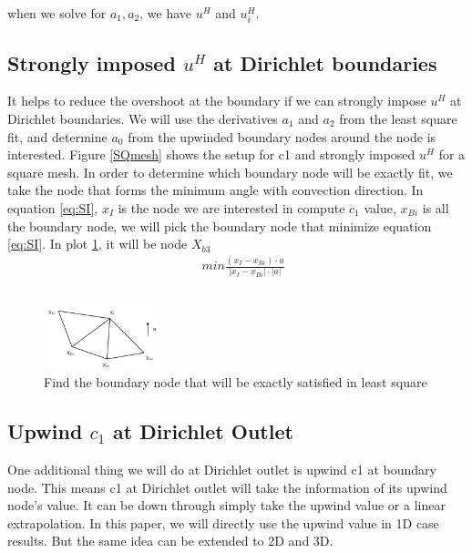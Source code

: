 \documentclass[10pt]{article}
\begin{document}
\noindent when we solve for $a_{1}, a_{2}$, we have $u^{H}$ and $u^{H}_{i}$. \\
\subsection{Strongly imposed $u^{H}$ at Dirichlet boundaries}
It helps to reduce the overshoot at the boundary if we can strongly impose $u^{H}$ at Dirichlet boundaries. We will use the derivatives $a_1$ and $a_2$ from the least square fit, and determine $a_0$ from the upwinded boundary nodes around the node is interested. Figure \ref{SQmesh} shows the setup for c1 and strongly imposed $u^H$ for a square mesh. In order to determine which boundary node will be exactly fit, we take the node that forms the minimum angle with convection direction. In equation \ref{eq:SI}, $x_{I}$ is the node we are interested in compute $c_{1}$ value, $x_{Bi}$ is all the boundary node, we will pick the boundary node that minimize equation \ref{eq:SI}. In plot \ref{minDirection}, it will be node $X_{b3}$
\begin{equation}
    \begin{aligned}
       \quad min \frac{(x_{I}-x_{Bi})\cdot a}{|x_{I}-x_{Bi}|\cdot |a|}  \\
    \end{aligned}\label{eq:SI} 
\end{equation}

\begin{figure}[h!]
	\begin{center}
	\includegraphics[width=0.3\textwidth, clip]{./figure/xIxb.png}
	\end{center}
		\vspace{0mm}
    \caption{Find the boundary node that will be exactly satisfied in least square}
  	\label{minDirection}
\end{figure}

\subsection{Upwind $c_{1}$ at Dirichlet Outlet}
One additional thing we will do at Dirichlet outlet is upwind c1 at boundary node. This means c1 at Dirichlet outlet will take the information of its upwind node's value. It can be down through simply take the upwind value or a linear extrapolation. In this paper, we will directly use the upwind value in 1D case results. But the same idea can be extended to 2D and 3D.
\end{document}
